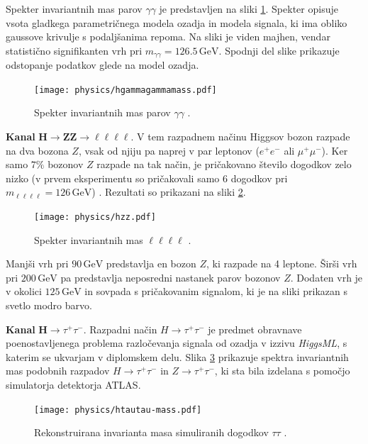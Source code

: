 \documentclass[11pt,a4paper,openany]{book}
\begin{document}
Spekter invariantnih mas parov $\gamma\gamma$ je predstavljen na sliki \ref{sl:hgammagamma}. Spekter opisuje vsota gladkega parametričnega modela ozadja in modela signala, ki ima obliko gaussove krivulje s podaljšanima repoma. Na sliki je viden majhen, vendar statistično signifikanten vrh pri $m_{\gamma\gamma} = \num{126,5}\,\text{GeV}$. Spodnji del slike prikazuje odstopanje podatkov glede na model ozadja.

\begin{figure}[ht]
	\centering
	\texttt{[image: physics/hgammagammamass.pdf]}
	
	\caption{ Spekter invariantnih mas parov $\gamma\gamma$ \cite{AadScience2012}. }
	\label{sl:hgammagamma}
\end{figure}


\textbf{Kanal} $\mathbf{H \rightarrow ZZ \rightarrow \ell\ell\ell\ell}$. V tem razpadnem načinu Higgsov bozon razpade na dva bozona $Z$, vsak od njiju pa naprej v par leptonov ($e^+e^-$ ali $\mu^+\mu^-$). Ker samo $7\%$ bozonov $Z$ razpade na tak način, je pričakovano število dogodkov zelo nizko (v prvem eksperimentu so pričakovali samo 6 dogodkov pri $m_{\ell\ell\ell\ell} = 126\,\text{GeV}$) \cite{AadScience2012}. Rezultati so prikazani na sliki \ref{sl:hzz}.

\begin{figure}[ht]
	\centering
	\texttt{[image: physics/hzz.pdf]}
	
	\caption{ Spekter invariantnih mas $\ell\ell\ell\ell$ \cite{AadScience2012}. }
	\label{sl:hzz}
\end{figure}

Manjši vrh pri $90\,\text{GeV}$ predstavlja en bozon $Z$, ki razpade na 4 leptone. Širši vrh pri $200\,\text{GeV}$ pa predstavlja neposredni nastanek parov bozonov $Z$. Dodaten vrh je v okolici $125\,\text{GeV}$ in sovpada s pričakovanim signalom, ki je na sliki prikazan s svetlo modro barvo.


\textbf{Kanal} ${\mathbf H \rightarrow \tau^+\tau^-}$. Razpadni način $H \rightarrow \tau^+\tau^-$ je predmet obravnave poenostavljenega problema razločevanja signala od ozadja v izzivu \textit{HiggsML}, s katerim se ukvarjam v diplomskem delu. Slika \ref{sl:htautaumass} prikazuje spektra invariantnih mas podobnih razpadov $H \rightarrow \tau^+\tau^-$ in $Z \rightarrow \tau^+\tau^-$, ki sta bila izdelana s pomočjo simulatorja detektorja ATLAS. 

\begin{figure}[ht]
	\centering
	\texttt{[image: physics/htautau-mass.pdf]}
	
	\caption{ Rekonstruirana invarianta masa simuliranih dogodkov $\tau\tau$ \cite{atlas2013}. }
	\label{sl:htautaumass}
\end{figure}
\end{document}
